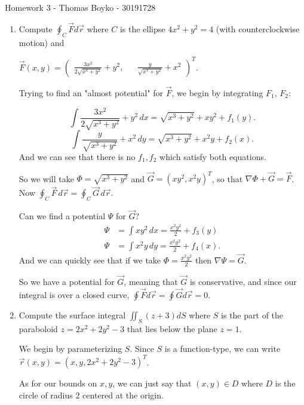 \documentclass{article}
\begin{document}
    \huge Homework 3 - Thomas Boyko - 30191728
    \normalsize
\begin{enumerate} 
\item Compute $\oint_C \vec{F} d\vec{r}$ where $C$ is the ellipse $4x^2 +y^2 = 4$ (with counterclockwise
    motion) and 

    $\vec{F} (x, y) = \begin{pmatrix} \frac{3x^2}{2\sqrt{x^3+y^2} }+y^2, 
    && \frac{y}{\sqrt{ x^3+y^2}}+x^2 \end{pmatrix}^{T}$.

    Trying to find an "almost potential" for $\vec{F}$, we begin by integrating $F_1,\, F_2$:

    \[
    \int \frac{3x^2}{2\sqrt{x^3+y^2} }+y^2 \, dx = \sqrt{x^3+y^2} +xy^2+f_1(y)
    .\] 
    \[
    \int \frac{y}{\sqrt{x^3+y^2} }+x^2 \, dy = \sqrt{x^3+y^2} +x^2y+f_2(x) 
    .\] 
    And we can see that there is no $f_1,f_2$ which satisfy both equations.

    So we will take $\Phi=\sqrt{x^3+y^2} $ and $\vec G=(xy^2, x^2y)^{T}$, so that 
    $\nabla \Phi+\vec{G}=\vec{F}$. Now $\oint_C\vec{F}\,d\vec{r}=\oint_C\vec{G}\,d\vec{r}$.

    Can we find a potential $\Psi$ for $\vec{G}$? 
    \begin{align*}
        \Psi&= \int xy^2\,dx =\frac{x^2y^2}{2}+f_3(y)\\
        \Psi&= \int x^2y\,dy =\frac{x^2y^2}{2}+f_4(x)
    .\end{align*}
    And we can quickly see that if we take $\Phi=\frac{x^2y^2}{2}$ then $\nabla \Psi=\vec{G}$.

    So we have a potential for $\vec{G}$, meaning that $\vec{G}$ is conservative, and since our
    integral is over a closed curve, $\oint \vec{F} d\vec{r}=\oint \vec{G} d \vec{r}=0$.

\item Compute the surface integral $\iint_S (z+3)dS$ where $S$ is the part of the
paraboloid $z = 2x^2 + 2y^2 - 3$ that lies below the plane $z = 1$.

    We begin by parameterizing $S$. 
    Since $S$ is a function-type, we can write 
    $\vec r(x,y)=( x,y,2x^2+2y^2-3 )^{T}$.

    As for our bounds on $x,y$, we can just say that $(x,y)\in D$ where $D$ is the circle of radius
    $2$ centered at the origin.


\end{enumerate}
\end{document}
